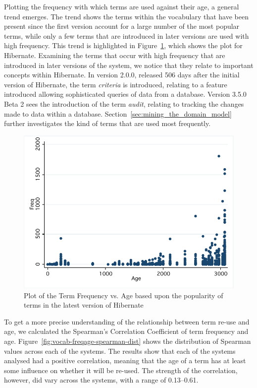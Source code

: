 Plotting the frequency with which terms are used against their age, a general trend emerges. The trend shows the terms within the vocabulary that have been present since the first version account for a large number of the most popular terms, while only a few terms that are introduced in later versions are used with high frequency. This trend is highlighted in Figure~\ref{fig:vocab-freqage-hibernate}, which shows the plot for Hibernate. Examining the terms that occur with high frequency that are introduced in later versions of the system, we notice that they relate to important concepts within Hibernate. In version 2.0.0, released 506 days after the initial version of Hibernate, the term \emph{criteria} is introduced, relating to a feature introduced allowing sophisticated queries of data from a database. Version 3.5.0 Beta 2 sees the introduction of the term \emph{audit}, relating to tracking the changes made to data within a database. Section~\ref{sec:mining_the_domain_model} further investigates the kind of terms that are used most frequently.

\begin{figure}[t]
\centering
\includegraphics[width=\textwidth]{Figures/Vocab-HibernateFrequencyAge.pdf}
\caption{Plot of the Term Frequency vs. Age based upon the popularity of terms in the latest version of Hibernate}
\label{fig:vocab-freqage-hibernate}
\end{figure}

To get a more precise understanding of the relationship between term re-use and age, we calculated the Spearman's Correlation Coefficient of term frequency and age. Figure~\ref{fig:vocab-freqage-spearman-dist} shows the distribution of Spearman values across each of the systems. The results show that each of the systems analysed had a positive correlation, meaning that the age of a term has at least some influence on whether it will be re-used. The strength of the correlation, however, did vary across the systems, with a range of 0.13--0.61.


